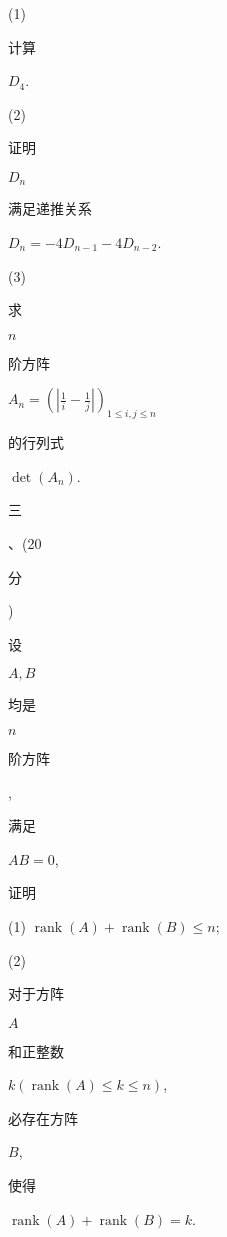 \documentclass[10pt]{article}
\begin{document}
(1) \begin{CJK}{UTF8}{mj}计算\end{CJK} $D_{4}$.

(2) \begin{CJK}{UTF8}{mj}证明\end{CJK} $D_{n}$ \begin{CJK}{UTF8}{mj}满足递推关系\end{CJK} $D_{n}=-4 D_{n-1}-4 D_{n-2}$.

(3) \begin{CJK}{UTF8}{mj}求\end{CJK} $n$ \begin{CJK}{UTF8}{mj}阶方阵\end{CJK} $A_{n}=\left(\left|\frac{1}{i}-\frac{1}{j}\right|\right)_{1 \leq i, j \leq n}$ \begin{CJK}{UTF8}{mj}的行列式\end{CJK} $\operatorname{det}\left(A_{n}\right)$.

\begin{CJK}{UTF8}{mj}三\end{CJK}、(20 \begin{CJK}{UTF8}{mj}分\end{CJK}) \begin{CJK}{UTF8}{mj}设\end{CJK} $A, B$ \begin{CJK}{UTF8}{mj}均是\end{CJK} $n$ \begin{CJK}{UTF8}{mj}阶方阵\end{CJK}, \begin{CJK}{UTF8}{mj}满足\end{CJK} $A B=0$, \begin{CJK}{UTF8}{mj}证明\end{CJK}

(1) $\operatorname{rank}(A)+\operatorname{rank}(B) \leq n$;

(2) \begin{CJK}{UTF8}{mj}对于方阵\end{CJK} $A$ \begin{CJK}{UTF8}{mj}和正整数\end{CJK} $k(\operatorname{rank}(A) \leq k \leq n)$, \begin{CJK}{UTF8}{mj}必存在方阵\end{CJK} $B$, \begin{CJK}{UTF8}{mj}使得\end{CJK} $\operatorname{rank}(A)+\operatorname{rank}(B)=k$.
\end{document}
